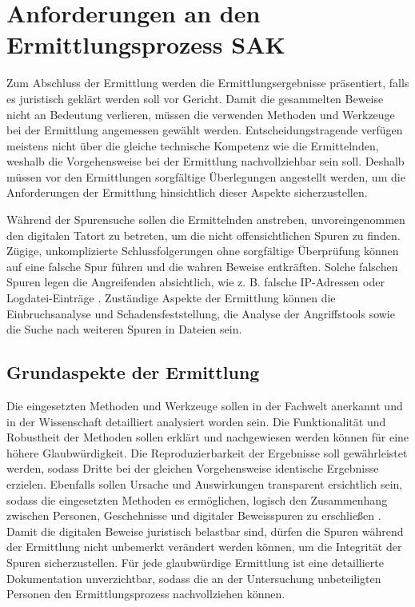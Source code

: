 \documentclass[12pt,DIV=14, version=first, BCOR=10mm,a4paper,twoside,parskip=half-,headsepline,headinclude]{scrartcl}
\begin{document}
\section{Anforderungen an den Ermittlungsprozess SAK}
Zum Abschluss der Ermittlung werden die Ermittlungsergebnisse präsentiert, falls es juristisch geklärt werden soll vor Gericht. Damit die gesammelten Beweise nicht an Bedeutung verlieren, müssen die verwenden Methoden und Werkzeuge bei der Ermittlung angemessen gewählt werden. Entscheidungstragende verfügen meistens nicht über die gleiche technische Kompetenz wie die Ermittelnden, weshalb die Vorgehensweise bei der Ermittlung nachvollziehbar sein soll. Deshalb müssen vor den Ermittlungen sorgfältige Überlegungen angestellt werden, um die Anforderungen der Ermittlung hinsichtlich dieser Aspekte sicherzustellen. 

Während der Spurensuche sollen die Ermittelnden anstreben, unvoreingenommen den digitalen Tatort zu betreten, um die nicht offensichtlichen Spuren zu finden. Zügige, unkomplizierte Schlussfolgerungen ohne sorgfältige Überprüfung können auf eine falsche Spur führen und die wahren Beweise entkräften. Solche falschen Spuren legen die Angreifenden absichtlich, wie z. B. falsche IP-Adressen oder Logdatei-Einträge \cite[vgl. S. 70]{texbook01}. Zuständige Aspekte der Ermittlung können die Einbruchsanalyse und Schadensfeststellung, die Analyse der Angriffstools sowie die Suche nach weiteren Spuren in Dateien sein.

    \subsection{Grundaspekte der Ermittlung} 
	Die eingesetzten Methoden und Werkzeuge sollen in der Fachwelt anerkannt und in der Wissenschaft detailliert analysiert worden sein. Die Funktionalität und Robustheit der Methoden sollen erklärt und nachgewiesen werden können für eine höhere Glaubwürdigkeit. Die Reproduzierbarkeit der Ergebnisse soll gewährleistet werden, sodass Dritte bei der gleichen Vorgehensweise identische Ergebnisse erzielen. Ebenfalls sollen Ursache und Auswirkungen transparent ersichtlich sein, sodass die eingesetzten Methoden es ermöglichen, logisch den Zusammenhang zwischen Personen, Geschehnisse und digitaler Beweisspuren zu erschließen \cite[vgl. S. 66-67]{texbook01}. Damit die digitalen Beweise juristisch belastbar sind, dürfen die Spuren während der Ermittlung nicht unbemerkt verändert werden können, um die Integrität der Spuren sicherzustellen. Für jede glaubwürdige Ermittlung ist eine detaillierte Dokumentation unverzichtbar, sodass die an der Untersuchung unbeteiligten Personen den Ermittlungsprozess nachvollziehen können.
	
\end{document}
